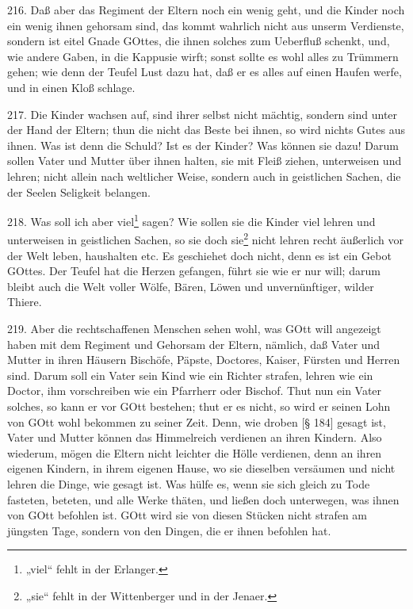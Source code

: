 216. Daß aber das Regiment der Eltern noch ein wenig geht, und die Kinder noch ein wenig ihnen gehorsam sind, das kommt wahrlich nicht aus unserm Verdienste, sondern ist eitel Gnade GOttes, die ihnen solches zum Ueberfluß schenkt, und, wie andere Gaben, in die Kappusie wirft; sonst sollte es wohl alles zu Trümmern gehen; wie denn der Teufel Lust dazu hat, daß er es alles auf einen Haufen werfe, und in einen Kloß schlage.

217. Die Kinder wachsen auf, sind ihrer selbst nicht mächtig, sondern sind unter der Hand der Eltern; thun die nicht das Beste bei ihnen, so wird nichts Gutes aus ihnen. Was ist denn die Schuld? Ist es der Kinder? Was können sie dazu! Darum sollen Vater und Mutter über ihnen halten, sie mit Fleiß ziehen, unterweisen und lehren; nicht allein nach weltlicher Weise, sondern auch in geistlichen Sachen, die der Seelen Seligkeit belangen.

218. Was soll ich aber viel\footnote{„viel“ fehlt in der Erlanger.} sagen? Wie sollen sie die Kinder viel lehren und unterweisen in geistlichen Sachen, so sie doch sie\footnote{„sie“ fehlt in der Wittenberger und in der Jenaer.} nicht lehren recht äußerlich vor der Welt leben, haushalten etc. Es geschiehet doch nicht, denn es ist ein Gebot GOttes. Der Teufel hat die Herzen gefangen, führt sie wie er nur will; darum bleibt auch die Welt voller Wölfe, Bären, Löwen und unvernünftiger, wilder Thiere.

219. Aber die rechtschaffenen Menschen sehen wohl, was GOtt will angezeigt haben mit dem Regiment und Gehorsam der Eltern, nämlich, daß Vater und Mutter in ihren Häusern Bischöfe, Päpste, Doctores, Kaiser, Fürsten und Herren sind. Darum soll ein Vater sein Kind wie ein Richter strafen, lehren wie ein Doctor, ihm vorschreiben wie ein Pfarrherr oder Bischof. Thut nun ein Vater solches, so kann er vor GOtt bestehen; thut er es nicht, so wird er seinen Lohn von GOtt wohl bekommen zu seiner Zeit. Denn, wie droben [§ 184] gesagt ist, Vater und Mutter können das Himmelreich verdienen an ihren Kindern. Also wiederum, mögen die Eltern nicht leichter die Hölle verdienen, denn an ihren eigenen Kindern, in ihrem eigenen Hause, wo sie dieselben versäumen und nicht lehren die Dinge, wie gesagt ist. Was hülfe es, wenn sie sich gleich zu Tode fasteten, beteten, und alle Werke thäten, und ließen doch unterwegen, was ihnen von GOtt befohlen ist. GOtt wird sie von diesen Stücken nicht strafen am jüngsten Tage, sondern von den Dingen, die er ihnen befohlen hat.

